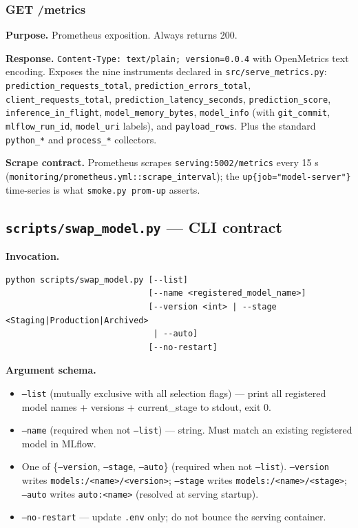\documentclass[11pt,a4paper]{article}
\begin{document}
\subsubsection{GET /metrics}

\textbf{Purpose.} Prometheus exposition. Always returns 200.

\textbf{Response.} \texttt{Content-Type: text/plain; version=0.0.4} with OpenMetrics text encoding. Exposes the nine instruments declared in \texttt{src/serve\_metrics.py}: \texttt{prediction\_requests\_total}, \texttt{prediction\_errors\_total}, \texttt{client\_requests\_total}, \texttt{prediction\_latency\_seconds}, \texttt{prediction\_score}, \texttt{inference\_in\_flight}, \texttt{model\_memory\_bytes}, \texttt{model\_info} (with \texttt{git\_commit}, \texttt{mlflow\_run\_id}, \texttt{model\_uri} labels), and \texttt{payload\_rows}. Plus the standard \texttt{python\_*} and \texttt{process\_*} collectors.

\textbf{Scrape contract.} Prometheus scrapes \texttt{serving:5002/metrics} every 15 s (\texttt{monitoring/prometheus.yml::scrape\_interval}); the \texttt{up\{job="model-server"\}} time-series is what \texttt{smoke.py prom-up} asserts.

\subsection{\texttt{scripts/swap\_model.py} --- CLI contract}

\textbf{Invocation.}
\begin{lstlisting}[style=bashstyle]
python scripts/swap_model.py [--list]
                             [--name <registered_model_name>]
                             [--version <int> | --stage <Staging|Production|Archived>
                              | --auto]
                             [--no-restart]
\end{lstlisting}

\textbf{Argument schema.}
\begin{itemize}[leftmargin=1.5em,itemsep=0pt]
  \item \texttt{--list} (mutually exclusive with all selection flags) --- print all registered model names + versions + current\_stage to stdout, exit 0.
  \item \texttt{--name} (required when not \texttt{--list}) --- string. Must match an existing registered model in MLflow.
  \item One of \{\texttt{--version}, \texttt{--stage}, \texttt{--auto}\} (required when not \texttt{--list}). \texttt{--version} writes \texttt{models:/<name>/<version>}; \texttt{--stage} writes \texttt{models:/<name>/<stage>}; \texttt{--auto} writes \texttt{auto:<name>} (resolved at serving startup).
  \item \texttt{--no-restart} --- update \texttt{.env} only; do not bounce the serving container.
\end{itemize}
\end{document}
